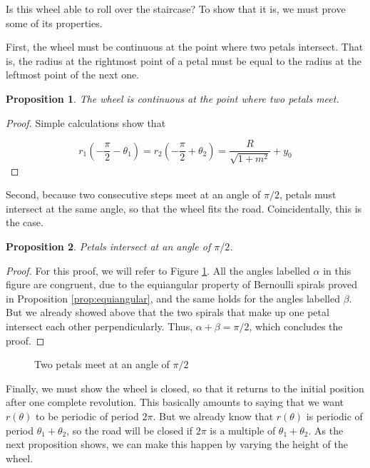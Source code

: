 \documentclass{article}
\theoremstyle{theorem}
\newtheorem{prop}{Proposition}[section]
\theoremstyle{theorem}
\begin{document}
Is this wheel able to roll over the staircase? To show that it is, we
must prove some of its properties.

First, the wheel must be continuous at the point where two petals
intersect. That is, the radius at the rightmost point of a petal must
be equal to the radius at the leftmost point of the next one.

\begin{prop}
  The wheel is continuous at the point where two petals meet.
\end{prop}

\begin{proof}
  Simple calculations show that

  \begin{equation}
    r_1\left(-\frac{\pi}{2}-\theta_1\right)=r_2\left(-\frac{\pi}{2}+\theta_2\right)=\frac{R}{\sqrt{1+m^2}}+y_0
  \end{equation}
\end{proof}

Second, because two consecutive steps meet at an angle of $\pi/2$,
petals must intersect at the same angle, so that the wheel fits the
road. Coincidentally, this is the case.

\begin{prop}
  Petals intersect at an angle of $\pi/2$.
\end{prop}

\begin{proof}
  For this proof, we will refer to Figure
  \ref{fig:complete-wheel}. All the angles labelled $\alpha$ in this
  figure are congruent, due to the equiangular property of Bernoulli
  spirals proved in Proposition \ref{prop:equiangular}, and the same
  holds for the angles labelled $\beta$. But we already showed above
  that the two spirals that make up one petal intersect each other
  perpendicularly. Thus, $\alpha+\beta=\pi/2$, which concludes the
  proof.
\end{proof}

\begin{figure}[h]
  \centering 
  \caption{Two petals meet at an angle of $\pi/2$}
  \label{fig:complete-wheel}
\end{figure}


Finally, we must show the wheel is closed, so that it returns to the
initial position after one complete revolution. This basically amounts
to saying that we want $r(\theta)$ to be periodic of period
$2\pi$. But we already know that $r(\theta)$ is periodic of period
$\theta_1+\theta_2$, so the road will be closed if $2\pi$ is a
multiple of $\theta_1+\theta_2$. As the next proposition shows, we can
make this happen by varying the height of the wheel.
\end{document}
